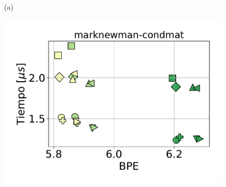 \begin{figure}
\begin{minipage}{1\textwidth}
\begin{minipage}{0.45\textwidth}
\begin{minipage}{0.2\textwidth}
    			\end{minipage}
    			
    			(a)
    		\end{minipage}
    		\begin{minipage}{0.45\textwidth}
    			\centering
    			\begin{minipage}{0.78\textwidth}
    				\centering
    				\includegraphics[width=1\linewidth]{img/sdsl/secuencial/marknewman-condmat.pdf}
    			\end{minipage}
    			\begin{minipage}{0.15\textwidth}
    				\centering

\end{minipage}
\end{minipage}
\end{minipage}
\end{figure}
